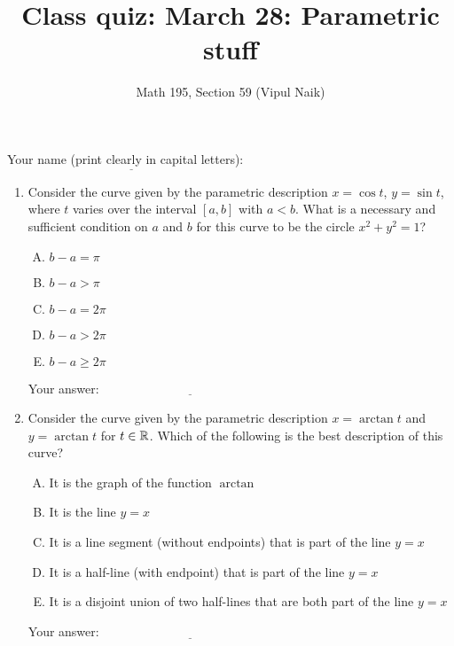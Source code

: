 \documentclass[10pt]{amsart}
\title{Class quiz: March 28: Parametric stuff}
\author{Math 195, Section 59 (Vipul Naik)}
\begin{document}
\maketitle

Your name (print clearly in capital letters): $\underline{\qquad\qquad\qquad\qquad\qquad\qquad\qquad\qquad\qquad\qquad}$

\begin{enumerate}
\item Consider the curve given by the parametric description $x = \cos
  t$, $y = \sin t$, where $t$ varies over the interval $[a,b]$ with $a <
  b$. What is a necessary and sufficient condition on $a$ and $b$ for
  this curve to be the circle $x^2 + y^2 = 1$?

  \begin{enumerate}[(A)]
  \item $b - a =\pi$
  \item $b - a > \pi$
  \item $b - a = 2\pi$
  \item $b - a > 2\pi$
  \item $b - a \ge 2\pi$
  \end{enumerate}

  \vspace{0.1in}
  Your answer: $\underline{\qquad\qquad\qquad\qquad\qquad\qquad\qquad}$
  \vspace{0.6in}

\item Consider the curve given by the parametric description $x =
  \arctan t$ and $y = \arctan t$ for $t \in \mathbb{R}$. Which of the
  following is the best description of this curve?

  \begin{enumerate}[(A)]
  \item It is the graph of the function $\arctan$
  \item It is the line $y = x$
  \item It is a line segment (without endpoints) that is part of the
    line $y = x$
  \item It is a half-line (with endpoint) that is part of the line $y
    = x$
  \item It is a disjoint union of two half-lines that are both part of
    the line $y = x$
  \end{enumerate}

  \vspace{0.1in}
  Your answer: $\underline{\qquad\qquad\qquad\qquad\qquad\qquad\qquad}$
  \vspace{0.6in}


\end{enumerate}
\end{document}
